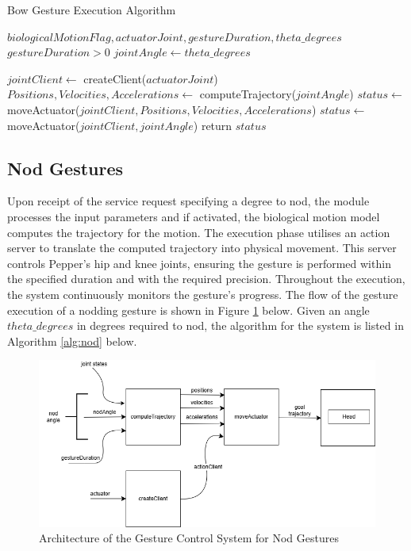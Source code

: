 \documentclass{CSSRforAfrica}
\begin{document}
\begin{algorithm}
	\caption{Bow Gesture Execution Algorithm}\label{alg:bow}
	\begin{algorithmic}
		\Require $biologicalMotionFlag,actuatorJoint, gestureDuration, theta\_degrees$
		\Ensure $gestureDuration > 0$
		\State $jointAngle \gets theta\_degrees$
		
		\State $jointClient \gets $ createClient($actuatorJoint$) 
			\State $Positions,Velocities, Accelerations \gets $ computeTrajectory($jointAngle$)
			\State $status \gets $ moveActuator($jointClient,Positions,Velocities, Accelerations$)
		\Else
			\State $status \gets $ moveActuator($jointClient,jointAngle$) 
		\EndIf
		\State return $status$
	\end{algorithmic}
\end{algorithm}


\newpage
\subsection{Nod Gestures}

Upon receipt of the service request specifying a degree to nod, the module processes the input parameters and if activated, the biological motion model computes the trajectory for the motion.
The execution phase utilises an action server to translate the computed trajectory into physical movement. This server controls Pepper's hip and knee joints, ensuring the gesture is performed within the specified duration and with the required precision. Throughout the execution, the system continuously monitors the gesture's progress.  The flow of the gesture execution of a nodding gesture is shown in Figure \ref{fig:nodarchitecture} below. Given an angle $theta\_degrees$  in degrees required to nod, the algorithm for the system is listed in Algorithm \ref{alg:nod} below. 

\begin{figure}[h!]
  \centering \includegraphics[scale=0.4]{Nod Architecture.png}
  \caption{Architecture of the Gesture Control System for Nod Gestures}
\label{fig:nodarchitecture}
\end{figure}
\end{document}
